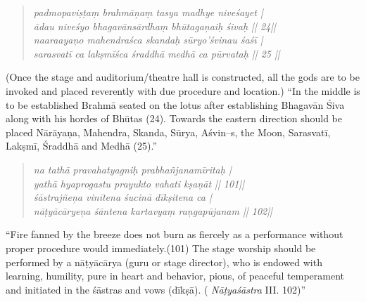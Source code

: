 \begin{verse}
\textit{padmopaviṣṭaṃ brahmāņaṃ tasya madhye niveśayet |}\\\textit{ādau niveśyo bhagavānsārdhaṃ bhūtagaņaiḥ śivaḥ || 24||}\\\textit{naaraayaņo mahendraśca skandaḥ sūryo’śvinau śaśī |}\\\textit{sarasvatī ca lakṣmīśca śraddhā medhā ca pūrvataḥ || 25 ||}
\end{verse}

(Once the stage and auditorium/theatre hall is constructed, all the gods are to be invoked and placed reverently with due procedure and location.) “In the middle is to be established Brahmā seated on the lotus after establishing Bhagavān Śiva along with his hordes of Bhūtas (24). Towards the eastern direction should be placed Nārāyaņa, Mahendra, Skanda, Sūrya, Aśvin–s, the Moon, Sarasvatī, Lakṣmī, Śraddhā and Medhā (25).”

\begin{verse}
\textit{na tathā pravahatyagniḥ prabhañjanamīritaḥ |}\\\textit{yathā hyaprogastu prayukto vahati kṣaņāt || 101||}\\\textit{śāstrajñeņa vinītena śucinā dīkṣitena ca | }\\\textit{nāṭyācāryeņa śāntena kartavyaṃ raņgapūjanam || 102||}
\end{verse}

“Fire fanned by the breeze does not burn as fiercely as a performance without proper procedure would immediately.(101) The stage worship should be performed by a nāṭyācārya (guru or stage director), who is endowed with learning, humility, pure in heart and behavior, pious, of peaceful temperament and initiated in the śāstras and vows (dīkṣā). ( \textit{Nāṭyaśāstra} III. 102)”

